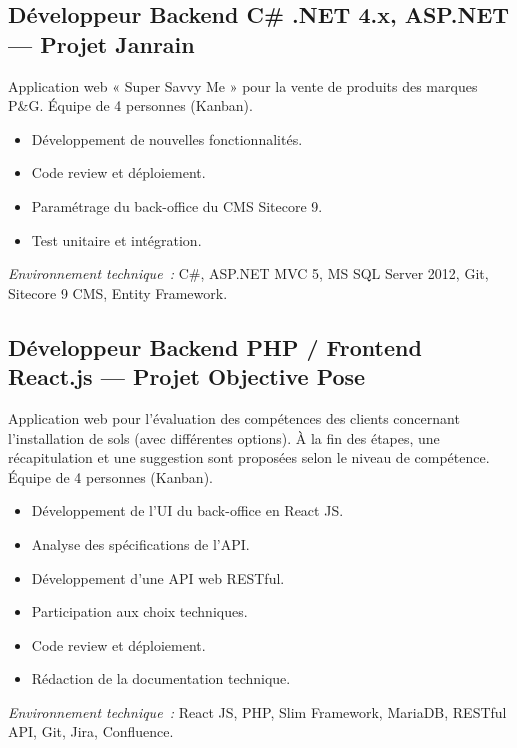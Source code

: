 \documentclass[10pt,a4paper]{article}
\begin{document}
\vspace{6pt}

\subsection*{Développeur Backend C\# .NET 4.x, ASP.NET --- Projet Janrain}
\color{darkgray}
Application web « Super Savvy Me » pour la vente de produits des marques P\&G. Équipe de 4 personnes (Kanban).
\begin{itemize}
  \item Développement de nouvelles fonctionnalités.
  \item Code review et déploiement.
  \item Paramétrage du back-office du CMS Sitecore 9.
  \item Test unitaire et intégration.
\end{itemize}
\textit{Environnement technique~:} C\#, ASP.NET MVC 5, MS SQL Server 2012, Git, Sitecore 9 CMS, Entity Framework.

\vspace{6pt}

\subsection*{Développeur Backend PHP / Frontend React.js --- Projet Objective Pose}
\color{darkgray}
Application web pour l'évaluation des compétences des clients concernant l'installation de sols (avec différentes options). À la fin des étapes, une récapitulation et une suggestion sont proposées selon le niveau de compétence. Équipe de 4 personnes (Kanban).
\begin{itemize}
  \item Développement de l'UI du back-office en React JS.
  \item Analyse des spécifications de l'API.
  \item Développement d'une API web RESTful.
  \item Participation aux choix techniques.
  \item Code review et déploiement.
  \item Rédaction de la documentation technique.
\end{itemize}
\textit{Environnement technique~:} React JS, PHP, Slim Framework, MariaDB, RESTful API, Git, Jira, Confluence.

\vspace{6pt}
\end{document}
